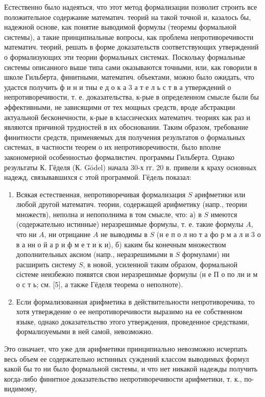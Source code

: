 \documentclass[10pt]{article}
\begin{document}
Естественно было надеяться, что этот метод формализации позволит строить все положительное содержание математич. теорий на такой точной и, казалось бы, надежной основе, как понятие выводимой формулы (теоремы формальной системы), а такие принципиальные вопросы, как проблема непротиворечивости математич. теорий, решать в форме доказательств соответствующих утверждений о формализующих эти теории формальных системах. Поскольку формальные системы описанного выше типа сами оказываются точными, или, как говорили в школе Гильберта, финитными, математич. объектами, можно было ожидать, что удастся получить ф и н и тны е д о к а 3 а т е л ь с т в а утверждений о непротиворечивости, т. е. доказательства, к-рые в определенном смысле были бы әффективными, не зависящими от тех мощных средств, вроде абстракции актуальной бесконечности, к-рые в классических математич. теориях как раз и являются причиной трудностей в их обосновании. Таким образом, требование финитности средств, применяемых для получения результатов о формальных системах, в частности теорем о их непротиворечивости, было вполне закономерной особенностью формалистич. программы Гильберта. Однако результаты К. Гёделя (К. Gödel) начала 30-х гг. 20 в. привели к краху основных надежд, связывавшихся с этой программой. Гёдель показал:



\begin{enumerate}

  \item Всякая естественная, непротиворечивая формализация $S$ арифметики или любой другой математич. теории, содержащей арифметику (напр., теории множеств), неполна и непополнима в том смысле, что: а) в $S$ имеются (содержательно истинные) неразрешимые формулы, т. е. такие формулы $A$, что ни $A$, ни отрицание $A$ не выводимы в $S$ (н е п о л но т а фо р м а л и 3 о в а нн о й а р и ф м е т и к и), б) каким бы конечным множеством дополнительных аксиом (напр., неразрешимыми в $S$ формулами) ни расширить систему $S$, в новой, усиленной таким образом, формальной сістеме неизбежно появятся свои неразрешимые формулы (н е П о по лн и м о с т ь; см. [5], а также Гёделя теорема о неполноте).



  \item Если формализованная арифметика в действительности непротиворечива, то хотя утверждение о ее непротиворечивости выразимо на ее собственном языке, однако доказательство этого утверждения, проведенное средствами, формализуемыми в ней самой, невозможно.



\end{enumerate}



Это означает, что уже для арифметики принципиально невозможно исчерпать весь объем ее содержательно истинных суждений классом выводимых формул какой бы то ни было формальной системы, и что нет никакой надежды получить когда-либо финитное доказательство непротиворечивости арифметики, т. к., по-видимому,
\end{document}
